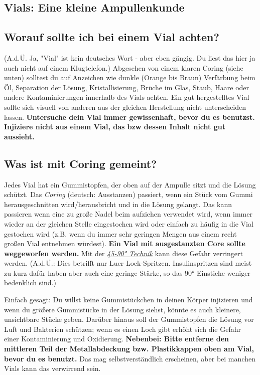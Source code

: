 \documentclass{article}
\begin{document}
\subsection*{Vials: Eine kleine Ampullenkunde}

\subsection{Worauf sollte ich bei einem Vial achten?}

(A.d.Ü. Ja, "Vial" ist kein deutsches Wort - aber eben gängig. Du liest das hier ja auch nicht auf einem Klugtelefon.) Abgesehen von einem klaren Coring (siehe unten) solltest du auf Anzeichen wie dunkle (Orange bis Braun) Verfärbung beim Öl, Separation der Lösung, Kristallisierung, Brüche im Glas, Staub, Haare oder andere Kontaminierungen innerhalb des Vials achten. Ein gut hergestelltes Vial sollte sich visuell von anderen aus der gleichen Herstellung nicht unterscheiden lassen. \textbf{Untersuche dein Vial immer gewissenhaft, bevor du es benutzst. Injiziere nicht aus einem Vial, das bzw dessen Inhalt nicht gut aussieht.}

\subsection{Was ist mit Coring gemeint?}\label{5-23}

Jedes Vial hat ein Gummistopfen, der oben auf der Ampulle sitzt und die Lösung schützt. Das \textit{Coring} (deutsch: Ausstanzen) passiert, wenn ein Stück vom Gummi herausgeschnitten wird/herausbricht und in die Lösung gelangt. Das kann passieren wenn eine zu große Nadel beim aufziehen verwendet wird, wenn immer wieder an der gleichen Stelle eingestochen wird oder einfach zu häufig in die Vial gestochen wird (z.B. wenn du immer sehr geringen Mengen aus einem recht großen Vial entnehmen würdest). \textbf{Ein Vial mit ausgestanzten Core sollte weggeworfen werden. }Mit der \href{https://www.youtube.com/watch?v=w5F0SLoMjC8}{\textit{45-90° Technik}} kann diese Gefahr verringert werden. (A.d.Ü.: Dies betrifft nur Luer Lock-Spritzen. Insulinspritzen sind meist zu kurz dafür haben aber auch eine geringe Stärke, so das 90° Einstiche weniger bedenklich sind.)

Einfach gesagt: Du willst keine Gummistückchen in deinen Körper injizieren und wenn du größere Gummistücke in der Lösung siehst, könnte es auch kleinere, unsichtbare Stücke geben. Darüber hinaus soll der Gummistopfen die Lösung vor Luft und Bakterien schützen; wenn es einen Loch gibt erhöht sich die Gefahr einer Kontaminierung und Oxidierung. \textbf{Nebenbei: Bitte entferne den mittleren Teil der Metallabdeckung bzw. Plastikkappen oben am Vial, bevor du es benutzt. }Das mag selbstverständlich erscheinen, aber bei manchen Vials kann das verwirrend sein.
\end{document}

